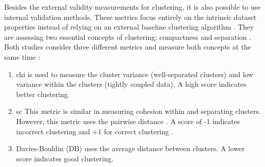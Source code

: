 Besides the external validity measurements for clustering, it is also possible to use internal validation methods.
These metrics focus entirely on the intrinsic dataset properties instead of relying on an external baseline clustering algorithm \citep{craenendonck_using_nodate}.
They are assessing two essential concepts of clustering: compactness and separation \citep{hassani_using_2017}.
Both studies consider three different metrics and measure both concepts at the same time \citep{hassani_using_2017}:
\begin{enumerate}
    \item \gls{chi} \citep{calinski_dendrite_1974} is used to measure the cluster variance (well-separated clusters) and low variance within the clusters (tightly coupled data). A high score indicates better clustering.
    \item \gls{sc} \citep{rousseeuw_silhouettes_1987} This metric is similar in measuring cohesion within and separating clusters.
          However, this metric uses the pairwise distance \citep{hassani_using_2017}.
          A score of -1 indicates incorrect clustering and +1 for correct clustering \citep{rousseeuw_silhouettes_1987}.
    \item Davies-Bouldin (DB) \citep{davies_cluster_1979} uses the average distance between clusters. A lower score indicates good clustering.
\end{enumerate}


